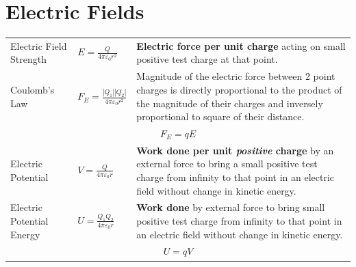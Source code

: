 \documentclass[a4paper,11pt]{article}
\begin{document}
	\section{Electric Fields}
	\begin{center}
		\renewcommand{\arraystretch}{1.8}
		\begin{tabular}{@{} l l p{8.5cm} @{}}
			\toprule
			Electric Field Strength & $\displaystyle E=\frac{Q}{4\pi \varepsilon_0 r^2}$ & \textbf{Electric force per unit charge} acting on small positive test charge at that point. \\
			Coulomb's Law & $\displaystyle F_E=\frac{|Q_1||Q_2|}{4\pi \varepsilon_0 r^2}$ & Magnitude of the electric force between 2 point charges is directly proportional to the product of the magnitude of their charges and inversely proportional to square of their distance.\\
			\multicolumn{3}{c}{$F_E=qE$} \\
			\midrule
			Electric Potential & $\displaystyle V = \frac{Q}{4\pi \varepsilon_0 r}$ & \textbf{Work done per unit \textit{positive} charge} by an external force to bring a small positive test charge from infinity to that point in an electric field without change in kinetic energy. \\
			Electric Potential Energy & $\displaystyle U = \frac{Q_1 Q_2}{4\pi \varepsilon_0 r}$ & \textbf{Work done } by external force to bring small positive test charge from infinity to that point in an electric field without change in kinetic energy.\\
			\multicolumn{3}{c}{$U=qV$} \\
			\bottomrule
		\end{tabular}
	\end{center}
	
	\newpage
\end{document}
